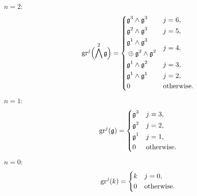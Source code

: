 \begin{description}
  \item[$n=2:$]
        \begin{equation*}
          \operatorname{gr}^{j}\Bigl( \bigwedge^{2}\mathfrak{g} \Bigr) =
          \begin{dcases}
            \mathfrak{g}^{3} \wedge \mathfrak{g}^{3} & j=6,                                                                             \\
            \mathfrak{g}^{2} \wedge \mathfrak{g}^{3} & j=5,                                                                             \\
            \!\begin{aligned} & \mathfrak{g}^{1} \wedge \mathfrak{g}^{3} \\ & \oplus \mathfrak{g}^{2} \wedge \mathfrak{g}^{2} \end{aligned} & j=4, \\
            \mathfrak{g}^{1} \wedge \mathfrak{g}^{2}                                                                             & j=3, \\
            \mathfrak{g}^{1} \wedge \mathfrak{g}^{1}                                                                             & j=2, \\
            0                                                                                                         & \text{otherwise.}
          \end{dcases}
        \end{equation*}

  \item[$n=1:$]
        \begin{equation*}
          \operatorname{gr}^{j}(\mathfrak{g}) =
          \begin{dcases}
            \mathfrak{g}^{3} & j=3, \\
            \mathfrak{g}^{2} & j=2, \\
            \mathfrak{g}^{1} & j=1, \\
            0          & \text{otherwise.}
          \end{dcases}
        \end{equation*}

  \item[$n=0:$]
        \begin{equation*}
          \operatorname{gr}^{j}(k) =
          \begin{dcases}
            k & j=0, \\
            0 & \text{otherwise.}
          \end{dcases}
        \end{equation*}
\end{description}

